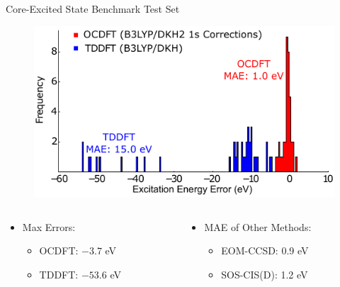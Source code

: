 \documentclass[t]{beamer}
\begin{document}
\begin{frame}{Core-Excited State Benchmark Test Set}
\begin{figure}[!t]
\includegraphics[scale=0.85]{ocdft_tddft_histogram.pdf}
\end{figure}
\begin{columns}
\begin{column}{0.5\textwidth}
\begin{itemize}
\item Max Errors:
		\begin{itemize}
		\item OCDFT: $-3.7$ eV
		\item TDDFT: $-53.6$ eV
		\end{itemize}
\end{itemize}
\end{column}
\begin{column}{0.5\textwidth}
\begin{itemize}
\item MAE of Other Methods:
		\begin{itemize}
		\item EOM-CCSD: 0.9 eV
		\item SOS-CIS(D): 1.2 eV
		\end{itemize}
\end{itemize}
\end{column}
\end{columns}
\end{frame}
\end{document}
